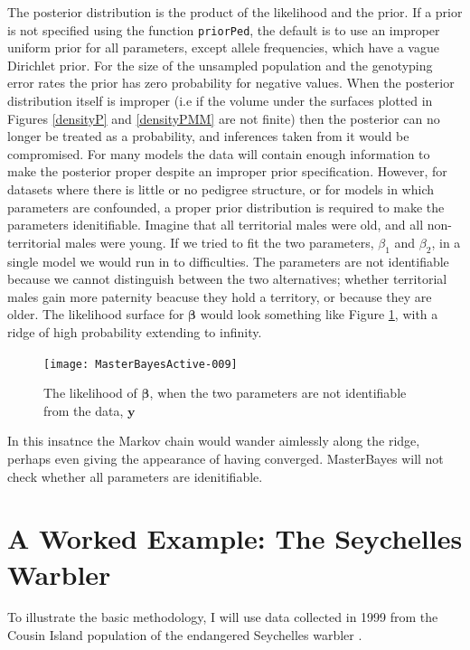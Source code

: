 \documentclass{article}
\begin{document}
The posterior distribution is the product of the likelihood and the prior. If a prior is not specified using the function \texttt{priorPed}, the default is to use an improper uniform prior for all parameters, except allele frequencies, which have a vague Dirichlet prior. For the size of the unsampled population and the genotyping error rates the prior has zero probability for negative values.  When the posterior distribution itself is improper (i.e if the volume under the surfaces plotted in Figures \ref{densityP} and \ref{densityPMM} are not finite) then the posterior can no longer be treated as a probability, and inferences taken from it would be compromised.  For many models the data will contain enough information to make the posterior proper despite an improper prior specification. However, for datasets where there is little or no pedigree structure, or for models in which parameters are confounded, a proper prior distribution is required to make the parameters idenitifiable.  Imagine that all territorial males were old, and all non-territorial males were young. If we tried to fit the two parameters, $\beta_{1}$ and $\beta_{2}$, in a single model we would run in to difficulties.  The parameters are not identifiable because we cannot distinguish between the two alternatives; whether territorial males gain more paternity beacuse they hold a territory, or because they are older.  The likelihood surface for $\bm{\beta}$ would look something like Figure \ref{likP}, with a ridge of high probability extending to infinity.\\  

\begin{figure}[!h]
\begin{center}
\texttt{[image: MasterBayesActive-009]}
\end{center}
\caption{The likelihood of $\bm{\beta}$, when the two parameters are not identifiable from the data, $\bm{y}$}
\label{likP}
\end{figure}

In this insatnce the Markov chain would wander aimlessly along the ridge, perhaps even giving the appearance of having converged.  MasterBayes will not check whether all parameters are idenitifiable.

\section{\large{A Worked Example: The Seychelles Warbler}}
\label{Warbler-sec}

To illustrate the basic methodology, I will use data collected in 1999 from the Cousin Island population of the endangered Seychelles warbler \citep{Richardson.2001}. 
\end{document}
